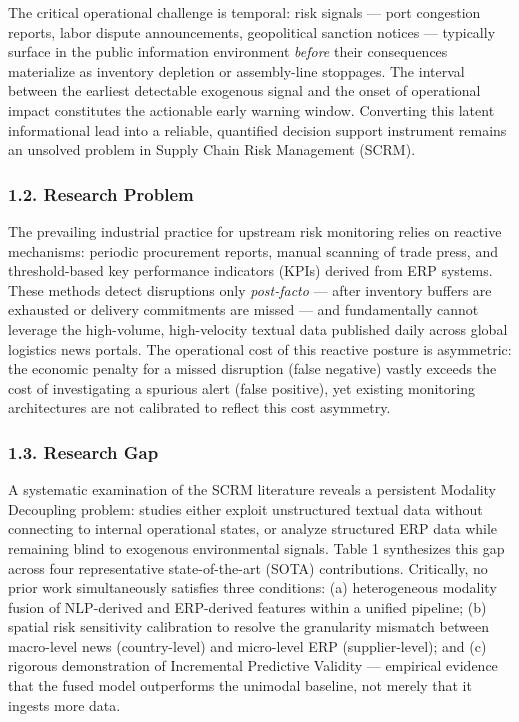 \documentclass[conference]{IEEEtran}
\begin{document}
The critical operational challenge is temporal: risk signals --- port
congestion reports, labor dispute announcements, geopolitical sanction
notices --- typically surface in the public information environment
\emph{before} their consequences materialize as inventory depletion or
assembly-line stoppages. The interval between the earliest detectable
exogenous signal and the onset of operational impact constitutes the
actionable early warning window. Converting this latent informational
lead into a reliable, quantified decision support instrument remains an
unsolved problem in Supply Chain Risk Management (SCRM).

\subsubsection{1.2. Research Problem}\label{research-problem}

The prevailing industrial practice for upstream risk monitoring relies
on reactive mechanisms: periodic procurement reports, manual scanning of
trade press, and threshold-based key performance indicators (KPIs)
derived from ERP systems. These methods detect disruptions only
\emph{post-facto} --- after inventory buffers are exhausted or delivery
commitments are missed --- and fundamentally cannot leverage the
high-volume, high-velocity textual data published daily across global
logistics news portals. The operational cost of this reactive posture is
asymmetric: the economic penalty for a missed disruption (false
negative) vastly exceeds the cost of investigating a spurious alert
(false positive), yet existing monitoring architectures are not
calibrated to reflect this cost asymmetry.

\subsubsection{1.3. Research Gap}\label{research-gap}

A systematic examination of the SCRM literature reveals a persistent
Modality Decoupling problem: studies either exploit unstructured textual
data without connecting to internal operational states, or analyze
structured ERP data while remaining blind to exogenous environmental
signals. Table 1 synthesizes this gap across four representative
state-of-the-art (SOTA) contributions. Critically, no prior work
simultaneously satisfies three conditions: (a) heterogeneous modality
fusion of NLP-derived and ERP-derived features within a unified
pipeline; (b) spatial risk sensitivity calibration to resolve the
granularity mismatch between macro-level news (country-level) and
micro-level ERP (supplier-level); and (c) rigorous demonstration of
Incremental Predictive Validity --- empirical evidence that the fused
model outperforms the unimodal baseline, not merely that it ingests more
data.
\end{document}
